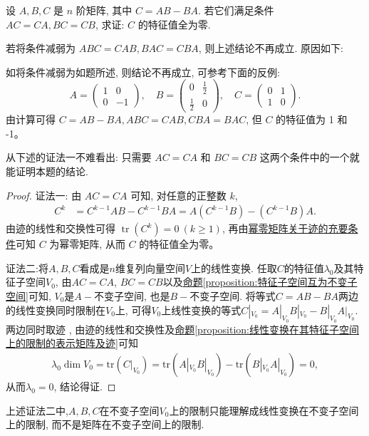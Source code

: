 \documentclass[../../main.tex]{subfiles}
\begin{document}
\begin{proposition}\label{proposition:经典矩阵乘法可交换诱导的性质例题}
设 \(A, B, C\) 是 \(n\) 阶矩阵, 其中 \(C = AB - BA\). 若它们满足条件 \(AC = CA, BC = CB\), 求证: \(C\) 的特征值全为零.
\end{proposition}
\begin{remark}
若将条件减弱为 \(ABC = CAB, BAC = CBA\), 则上述结论不再成立. 原因如下:

如将条件减弱为如题所述, 则结论不再成立, 可参考下面的反例:
\[
A = \begin{pmatrix}
1 & 0 \\ 
0 & -1
\end{pmatrix}, \quad
B = \begin{pmatrix}
0 & \frac{1}{2} \\ 
\frac{1}{2} & 0
\end{pmatrix}, \quad
C = \begin{pmatrix}
0 & 1 \\ 
1 & 0
\end{pmatrix}.
\]
由计算可得 \(C = AB - BA, ABC = CAB, CBA = BAC\), 但 \(C\) 的特征值为 1 和 -1。
\end{remark}
\begin{note}
从下述的{\color{blue}证法一}不难看出: 只需要 \(AC = CA\) 和 \(BC = CB\) 这两个条件中的一个就能证明本题的结论.
\end{note}
\begin{proof}
{\color{blue}证法一:}
由 \(AC = CA\) 可知, 对任意的正整数 \(k\),
\begin{align*}
C^k &= C^{k-1}AB - C^{k-1}BA = A(C^{k-1}B) - (C^{k-1}B)A.
\end{align*}
由迹的线性和交换性可得 \(\operatorname{tr}(C^k) = 0 \ (k \geq 1)\), 再由\hyperref[proposition:幂零矩阵关于迹的充要条件]{幂零矩阵关于迹的充要条件}可知 \(C\) 为幂零矩阵, 从而 \(C\) 的特征值全为零。

{\color{blue}证法二:}将\(A,B,C\)看成是\(n\)维复列向量空间\(V\)上的线性变换. 任取\(C\)的特征值\(\lambda_{0}\)及其特征子空间\(V_{0}\), 由\(AC = CA\), \(BC = CB\)以及\hyperref[proposition:特征子空间互为不变子空间]{命题\ref{proposition:特征子空间互为不变子空间}}可知, \(V_{0}\)是\(A -\)不变子空间, 也是\(B -\)不变子空间. 将等式\(C = AB - BA\)两边的线性变换同时限制在\(V_{0}\)上, 可得\(V_{0}\)上线性变换的等式\(C|_{V_{0}}=A|_{V_{0}}B|_{V_{0}}-B|_{V_{0}}A|_{V_{0}}\). 两边同时取迹 , 由迹的线性和交换性及\hyperref[proposition:线性变换在其特征子空间上的限制的表示矩阵及迹]{命题\ref{proposition:线性变换在其特征子空间上的限制的表示矩阵及迹}}可知
\begin{align*}
\lambda_{0}\dim V_{0}=\mathrm{tr}(C|_{V_{0}})=\mathrm{tr}(A|_{V_{0}}B|_{V_{0}})-\mathrm{tr}(B|_{V_{0}}A|_{V_{0}})=0,
\end{align*}
从而\(\lambda_{0}=0\), 结论得证.
\end{proof}
\begin{remark}
上述{\color{blue}证法二}中,\(A,B,C\)在不变子空间\(V_{0}\)上的限制只能理解成线性变换在不变子空间上的限制, 而不是矩阵在不变子空间上的限制. 
\end{remark}
\end{document}
